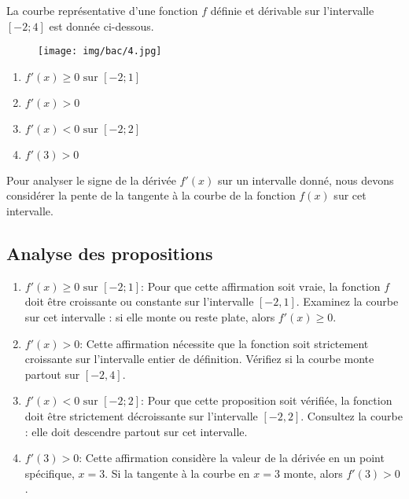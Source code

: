 \documentclass[answers]{exam}
\begin{document}
\begin{questions}
  \question[1] La courbe représentative d’une fonction $f$ définie et dérivable sur l’intervalle $[-2;4]$ est donnée ci-dessous.

\begin{figure}[H]
  \centering
  \texttt{[image: img/bac/4.jpg]}
\end{figure}

\begin{enumerate}
  \item $f'(x) \ge 0 \text{ sur } [-2;1]$
  \item $f'(x) > 0$
  \item $f'(x) < 0 \text{ sur } [-2;2]$
  \item $f'(3) > 0$
\end{enumerate}

  

\begin{solution}
Pour analyser le signe de la dérivée $f'(x)$ sur un intervalle donné, nous devons considérer la pente de la tangente à la courbe de la fonction $f(x)$ sur cet intervalle.

\subsection*{Analyse des propositions}

\begin{enumerate}
  \item $f'(x) \ge 0 \text{ sur } [-2;1]$: Pour que cette affirmation soit vraie, la fonction $f$ doit être croissante ou constante sur l'intervalle $[-2, 1]$. Examinez la courbe sur cet intervalle : si elle monte ou reste plate, alors $f'(x) \ge 0$.
  
  \item $f'(x) > 0$: Cette affirmation nécessite que la fonction soit strictement croissante sur l'intervalle entier de définition. Vérifiez si la courbe monte partout sur $[-2, 4]$.
  
  \item $f'(x) < 0 \text{ sur } [-2;2]$: Pour que cette proposition soit vérifiée, la fonction doit être strictement décroissante sur l'intervalle $[-2, 2]$. Consultez la courbe : elle doit descendre partout sur cet intervalle.
  
  \item $f'(3) > 0$: Cette affirmation considère la valeur de la dérivée en un point spécifique, $x=3$. Si la tangente à la courbe en $x=3$ monte, alors $f'(3) > 0$.
\end{enumerate}


\end{solution}
\end{questions}
\end{document}

